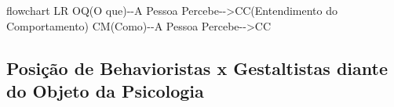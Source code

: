 \documentclass[
]{book}
\newenvironment{Shaded}{\begin{snugshade}}{\end{snugshade}}
\newcommand{\NormalTok}[1]{#1}
\begin{document}
\begin{Shaded}
\begin{Highlighting}[]
\NormalTok{flowchart LR}
\NormalTok{OQ(O que){-}{-}A Pessoa Percebe{-}{-}\textgreater{}CC(Entendimento do Comportamento)}
\NormalTok{CM(Como){-}{-}A Pessoa Percebe{-}{-}\textgreater{}CC}
\end{Highlighting}
\end{Shaded}

\hypertarget{posiuxe7uxe3o-de-behavioristas-x-gestaltistas-diante-do-objeto-da-psicologia}{%
\subsection{Posição de Behavioristas x Gestaltistas diante do Objeto da Psicologia}\label{posiuxe7uxe3o-de-behavioristas-x-gestaltistas-diante-do-objeto-da-psicologia}}
\end{document}
